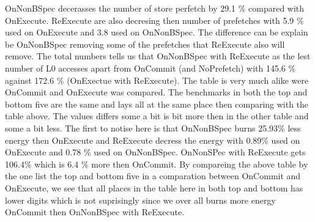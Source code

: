 \resSp
{}
OnNonBSpec decerasses the number of store perfetch by 29.1 \% compared with OnExecute. ReExecute are also decresing then number of prefetches with 5.9 \% used on OnExecute and 3.8 used on OnNonBSpec. The difference can be explain be OnNonBSpec removing some of the prefetches that ReExecute also will remove. The total numbers tells us that OnNonBSpec with ReExecute as the lest number of L0 accesses apart from OnCommit (and NoPrefetch) with 145.6 \% against 172.6 \% (OnExectue with ReExecute).  
The table is very much alike \fixme were OnCommit and OnExecute was compared. The benchmarks in both the top and bottom five are the same and lays all at the same place then comparing with the table above. The values differs some a bit is bit more then in the other table and some a bit less.
\resEnergy
The first to notise here is that OnNonBSpec burns 25.93\% less energy then OnExecute and ReExecute decress the energy with 0.89\% used on OnExecute and 0.78 \% used on OnNonBSpec. OnNonSPec with ReExecute gets 106.4\% which is 6.4 \% more then OnCommit.  
By compareing the above table by the one list the top and bottom five in a comparation between OnCommit and OnExecute, we see that all places in the table here in both top and bottom has lower digits which is not suprisingly since we over all burns more energy OnCommit then OnNonBSpec with ReExecute.

